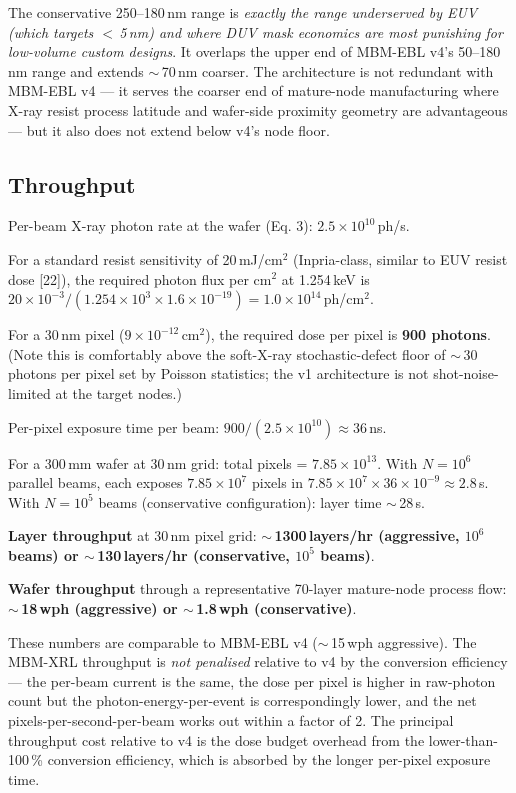\documentclass[11pt,letterpaper]{article}
\begin{document}
The conservative 250--180\,nm range is \textit{exactly the range underserved by EUV (which targets $<$\,5\,nm) and where DUV mask economics are most punishing for low-volume custom designs}. It overlaps the upper end of MBM-EBL v4's 50--180\,nm range and extends $\sim$\,70\,nm coarser. The architecture is not redundant with MBM-EBL v4 --- it serves the coarser end of mature-node manufacturing where X-ray resist process latitude and wafer-side proximity geometry are advantageous --- but it also does not extend below v4's node floor.

\subsection{Throughput}

Per-beam X-ray photon rate at the wafer (Eq. 3): $2.5 \times 10^{10}$\,ph/s.

For a standard resist sensitivity of 20\,mJ/cm$^2$ (Inpria-class, similar to EUV resist dose [22]), the required photon flux per cm$^2$ at 1.254\,keV is $20 \times 10^{-3} / (1.254 \times 10^3 \times 1.6 \times 10^{-19}) = 1.0 \times 10^{14}$\,ph/cm$^2$.

For a 30\,nm pixel ($9 \times 10^{-12}$\,cm$^2$), the required dose per pixel is \textbf{900 photons}. (Note this is comfortably above the soft-X-ray stochastic-defect floor of $\sim$\,30 photons per pixel set by Poisson statistics; the v1 architecture is not shot-noise-limited at the target nodes.)

Per-pixel exposure time per beam: $900 / (2.5 \times 10^{10}) \approx 36$\,ns.

For a 300\,mm wafer at 30\,nm grid: total pixels = $7.85 \times 10^{13}$. With $N = 10^6$ parallel beams, each exposes $7.85 \times 10^7$ pixels in $7.85 \times 10^7 \times 36 \times 10^{-9} \approx 2.8$\,s. With $N = 10^5$ beams (conservative configuration): layer time $\sim$\,28\,s.

\textbf{Layer throughput} at 30\,nm pixel grid: \textbf{$\sim$\,1300\,layers/hr (aggressive, $10^6$ beams) or $\sim$\,130\,layers/hr (conservative, $10^5$ beams)}.

\textbf{Wafer throughput} through a representative 70-layer mature-node process flow: \textbf{$\sim$\,18\,wph (aggressive) or $\sim$\,1.8\,wph (conservative)}.

These numbers are comparable to MBM-EBL v4 ($\sim$\,15\,wph aggressive). The MBM-XRL throughput is \textit{not penalised} relative to v4 by the conversion efficiency --- the per-beam current is the same, the dose per pixel is higher in raw-photon count but the photon-energy-per-event is correspondingly lower, and the net pixels-per-second-per-beam works out within a factor of 2. The principal throughput cost relative to v4 is the dose budget overhead from the lower-than-100\,\% conversion efficiency, which is absorbed by the longer per-pixel exposure time.
\end{document}
